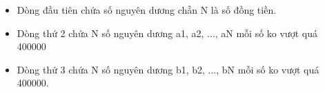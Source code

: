 \begin{itemize}
	\item Dòng đầu tiên chứa số nguyên dương chẵn N là số đồng tiền.
	\item Dòng thứ 2 chứa N số nguyên dương a1, a2, ..., aN mỗi số ko vượt quá 400000
	\item Dòng thứ 3 chứa N số nguyên dương b1, b2, ..., bN mỗi số ko vượt quá 400000.
\end{itemize}

\